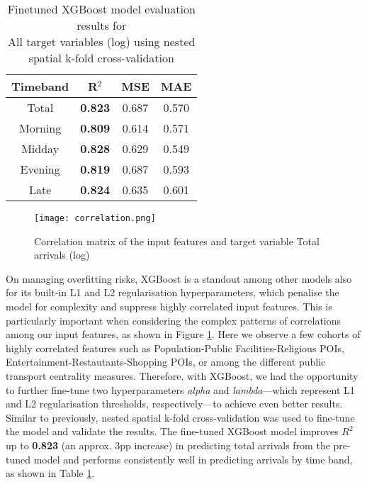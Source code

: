 \begin{table}[ht]
    \centering
    \renewcommand{\arraystretch}{1.5}
    \begin{tabular}{|c|c|c|c|}
        \hline
        \rowcolor{lightgray}
        \textbf{Timeband} & \textbf{R$^2$} & \textbf{MSE} & \textbf{MAE} \\
        \hline
        Total   & \textbf{0.823} & 0.687 & 0.570 \\
        Morning & \textbf{0.809} & 0.614 & 0.571 \\
        Midday  & \textbf{0.828} & 0.629 & 0.549 \\
        Evening & \textbf{0.819} & 0.687 & 0.593 \\
        Late    & \textbf{0.824} & 0.635 & 0.601 \\
        \hline
    \end{tabular}
    \captionsetup{justification=centering}
    \caption{Finetuned XGBoost model evaluation results for \\All target variables (log) using nested spatial k-fold cross-validation}
    \label{tab:modelevaltimeband}
\end{table}

\begin{figure}[!hbt]
    \centering
    \texttt{[image: correlation.png]}
    \captionsetup{justification=centering}
    \caption{Correlation matrix of the input features and target variable Total arrivals (log)}
    \label{fig:corrmatt}
\end{figure}

On managing overfitting risks, XGBoost is a standout among other models also for its built-in L1 and L2 regularisation hyperparameters, which penalise the model for complexity and suppress highly correlated input features. This is particularly important when considering the complex patterns of correlations among our input features, as shown in Figure \ref{fig:corrmatt}. Here we observe a few cohorts of highly correlated features such as Population-Public Facilities-Religious POIs, Entertainment-Restautants-Shopping POIs, or among the different public transport centrality measures. Therefore, with XGBoost, we had the opportunity to further fine-tune two hyperparameters \textit{alpha} and \textit{lambda}---which represent L1 and L2 regularisation thresholds, respectively---to achieve even better results. Similar to previously, nested spatial k-fold cross-validation was used to fine-tune the model and validate the results. The fine-tuned XGBoost model improves $R^2$ up to \textbf{0.823} (an approx. 3pp increase) in predicting total arrivals from the pre-tuned model and performs consistently well in predicting arrivals by time band, as shown in Table \ref{tab:modelevaltimeband}. 

